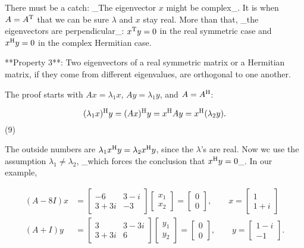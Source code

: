 There must be a catch: _The eigenvector \(x\) might be complex_. It is when \(A=A^{\rm T}\) that we can be sure \(\lambda\) and \(x\) stay real. More than that, _the eigenvectors are perpendicular_: \(x^{\rm T}y=0\) in the real symmetric case and \(x^{\rm H}y=0\) in the complex Hermitian case.

**Property 3**: Two eigenvectors of a real symmetric matrix or a Hermitian matrix, if they come from different eigenvalues, are orthogonal to one another.

The proof starts with \(Ax=\lambda_{1}x\), \(Ay=\lambda_{1}y\), and \(A=A^{\rm H}\):

\[(\lambda_{1}x)^{\rm H}y=(Ax)^{\rm H}y=x^{\rm H}Ay=x^{\rm H}(\lambda_{2}y).\] (9)

The outside numbers are \(\lambda_{1}x^{\rm H}y=\lambda_{2}x^{\rm H}y\), since the \(\lambda\)'s are real. Now wc use the assumption \(\lambda_{1}\neq\lambda_{2}\), _which forces the conclusion that \(x^{\rm H}y=0\)_. In our example,

\[\begin{split}(A-8I)x&=\begin{bmatrix}-6&3-i\\ 3+3i&-3\end{bmatrix}\begin{bmatrix}x_{1}\\ x_{2}\end{bmatrix}=\begin{bmatrix}0\\ 0\end{bmatrix},\qquad x=\begin{bmatrix}1\\ 1+i\end{bmatrix}\\ (A+I)y&=\begin{bmatrix}3&3-3i\\ 3+3i&6\end{bmatrix}\begin{bmatrix}y_{1}\\ y_{2}\end{bmatrix}=\begin{bmatrix}0\\ 0\end{bmatrix},\qquad y=\begin{bmatrix}1-i\\ -1\end{bmatrix}.\end{split}\]